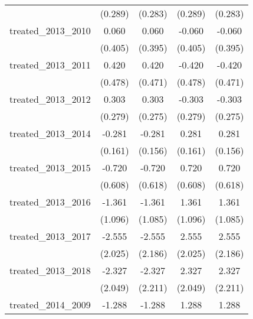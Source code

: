 {\begin{tabular}{l*{4}{c}}
            &     (0.289)         &     (0.283)         &     (0.289)         &     (0.283)         \\
[1em]
treated\_2013\_2010&       0.060         &       0.060         &      -0.060         &      -0.060         \\
            &     (0.405)         &     (0.395)         &     (0.405)         &     (0.395)         \\
[1em]
treated\_2013\_2011&       0.420         &       0.420         &      -0.420         &      -0.420         \\
            &     (0.478)         &     (0.471)         &     (0.478)         &     (0.471)         \\
[1em]
treated\_2013\_2012&       0.303         &       0.303         &      -0.303         &      -0.303         \\
            &     (0.279)         &     (0.275)         &     (0.279)         &     (0.275)         \\
[1em]
treated\_2013\_2014&      -0.281         &      -0.281         &       0.281         &       0.281         \\
            &     (0.161)         &     (0.156)         &     (0.161)         &     (0.156)         \\
[1em]
treated\_2013\_2015&      -0.720         &      -0.720         &       0.720         &       0.720         \\
            &     (0.608)         &     (0.618)         &     (0.608)         &     (0.618)         \\
[1em]
treated\_2013\_2016&      -1.361         &      -1.361         &       1.361         &       1.361         \\
            &     (1.096)         &     (1.085)         &     (1.096)         &     (1.085)         \\
[1em]
treated\_2013\_2017&      -2.555         &      -2.555         &       2.555         &       2.555         \\
            &     (2.025)         &     (2.186)         &     (2.025)         &     (2.186)         \\
[1em]
treated\_2013\_2018&      -2.327         &      -2.327         &       2.327         &       2.327         \\
            &     (2.049)         &     (2.211)         &     (2.049)         &     (2.211)         \\
[1em]
treated\_2014\_2009&      -1.288         &      -1.288         &       1.288         &       1.288         \\

\end{tabular}}
